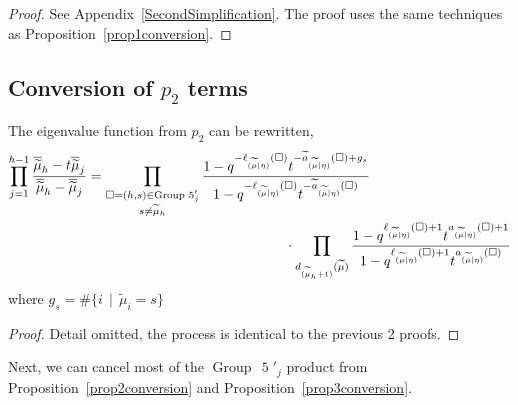 \documentclass[ALCO]{cedram}
\newcommand{\mutilde}{{\widetilde{\mu}}}
\newcommand{\mutildeeta}{{(\mutilde \mid \eta)}}
\newcommand{\leg}[1]{{\ell_{#1}(\square)}}
\newcommand{\armone}[1]{{\widetilde{a}_{#1}(\square)}}
\newcommand{\armtwo}[1]{{a_{#1}(\square)}}
\newcommand{\group}[1]{\operatorname{Group}\,\operatorname{#1}}
\begin{document}
\begin{proof} See Appendix~\ref{SecondSimplification}. The proof uses the same techniques as Proposition~\ref{prop1conversion}. \end{proof}



\subsection{\texorpdfstring{Conversion of $p_2$ terms}{Conversion of p2 terms}} 

\begin{prop}\label{prop3conversion}
The eigenvalue function from $p_2$ can be rewritten,
\begin{align*} \prod_{j=1}^{h-1} \frac{\overline{\mutilde}_h-t\overline{\mutilde}_j}{\overline{\mutilde}_h-\overline{\mutilde}_j} &= \prod_{\substack{\square = (h,s) \in \group{5}'_j \\ s\neq \mutilde_h}} \frac{1-q^{-\leg{\mutildeeta}}t^{-\armone{\mutildeeta}+g_s}}{1-q^{-\leg{\mutildeeta}}t^{-\armone{\mutildeeta}}} \\ & \hspace*{5cm}\cdot \prod_{d_{(\mutilde_h+1)}(\mutilde)} \frac{1-q^{\leg{\mutildeeta}+1}t^{\armtwo{\mutildeeta}+1}}{1-q^{\leg{\mutildeeta}+1}t^{\armtwo{\mutildeeta}}} \end{align*}
where $g_s = \# \{ i \, \mid \, \mutilde_i = s\}$
\end{prop}

\begin{proof}
Detail omitted, the process is identical to the previous 2 proofs.
\end{proof}

Next, we can cancel most of the $\group{5}'_j$ product from Proposition~\ref{prop2conversion} and Proposition~\ref{prop3conversion}.
\end{document}
